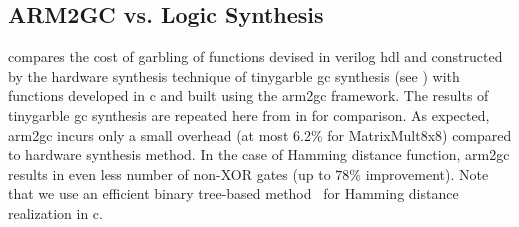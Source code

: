 \subsection{ARM2GC vs. Logic Synthesis}
 compares the cost of garbling of functions devised in \gls{verilog} \acrshort{hdl} and constructed by the hardware synthesis technique of \gls{tinygarble} \acrshort{gc} synthesis (see ) with functions developed in \gls{c} and built using the \gls{arm2gc} framework.
The results of \gls{tinygarble} \acrshort{gc} synthesis are repeated here from  in  for comparison.
As expected, \gls{arm2gc} incurs only a small overhead (at most 6.2\% for MatrixMult8x8) compared to  hardware synthesis method.
In the case of Hamming distance function, \gls{arm2gc} results in even less number of non-XOR gates (up to $78\%$ improvement).
Note that we use an efficient binary tree-based method~\cite{huang2011faster} for Hamming distance realization in \gls{c}.


